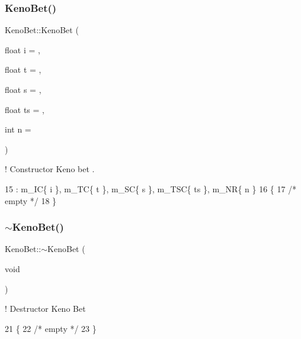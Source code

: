 \subsubsection{\texorpdfstring{Keno\+Bet()}{KenoBet()}\hspace{0.1cm}{\footnotesize\ttfamily [1/2]}}
{\footnotesize\ttfamily Keno\+Bet\+::\+Keno\+Bet (\begin{DoxyParamCaption}\item[{float}]{i = {},  }\item[{float}]{t = {},  }\item[{float}]{s = {},  }\item[{float}]{ts = {},  }\item[{int}]{n = {} }\end{DoxyParamCaption})\hspace{0.3cm}{\ttfamily [inline]}}



! Constructor Keno bet . 


\begin{DoxyCode}
15             :    m\_IC\{ i \}, m\_TC\{ t \}, m\_SC\{ s \}, m\_TSC\{ ts \}, m\_NR\{ n \}
16         \{
17             \textcolor{comment}{/* empty */}
18         \}
\end{DoxyCode}
\mbox{\label{classKenoBet_aed0e6361718c05a48c1be8653ffcf2d4}} 
\subsubsection{\texorpdfstring{$\sim$\+Keno\+Bet()}{~KenoBet()}}
{\footnotesize\ttfamily Keno\+Bet\+::$\sim$\+Keno\+Bet (\begin{DoxyParamCaption}\item[{void}]{ }\end{DoxyParamCaption})\hspace{0.3cm}{\ttfamily [inline]}}



! Destructor Keno Bet 


\begin{DoxyCode}
21         \{
22             \textcolor{comment}{/* empty */}
23         \}
\end{DoxyCode}
\mbox{\label{classKenoBet_aaabc53c7d5505c3aae1de7b685f72f05}} 
